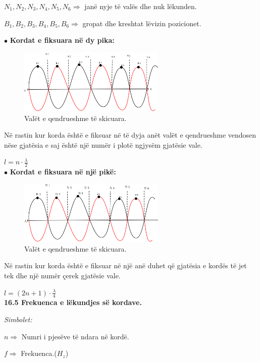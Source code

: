 \documentclass[twocolumn]{article}
\begin{document}
$N_1,N_2,N_3,N_4,N_5,N_6 \Rightarrow $ janë nyje të valës dhe nuk lëkunden.


$B_1,B_2,B_3,B_4,B_5,B_6 \Rightarrow$  gropat dhe kreshtat lëvizin pozicionet.


 $\bullet$  \textbf{ Kordat e fiksuara në dy pika:}
	\begin{figure}[h]
	\includegraphics[width=70mm]{Imazhet/Valet e qendrueshme1.png}
	\caption{Valët e qendrueshme të skicuara.}
	\label{fig:boat1}
\end{figure}

Në rastin kur korda është e fiksuar në të dyja anët valët e qendrueshme vendosen nëse gjatësia e saj është një numër i plotë ngjysëm gjatësie vale.

$l= n \cdot \frac{\lambda}{2}$\\


 $\bullet$  \textbf{ Kordat e fiksuara në një pikë:}
 
	\begin{figure}[h]
	\includegraphics[width=70mm]{Imazhet/Valet e qendrueshme2.png}
	\caption{Valët e qendrueshme të skicuara.}
	\label{fig:boat1}
\end{figure}

Në rastin kur korda është e fiksuar në një anë duhet që gjatësia e kordës të jet tek dhe një numër çerek gjatësie vale.

$l=(2n+1)\cdot \frac{\lambda}{4}$\\


\textbf{16.5 Frekuenca e lëkundjes së kordave.}

\begin{center}
	\textit{Simbolet:}
\end{center}

$n$$\Rightarrow$ Numri i pjesëve të ndara në kordë.

$f\Rightarrow $ Frekuenca.($H_z$)
\end{document}
